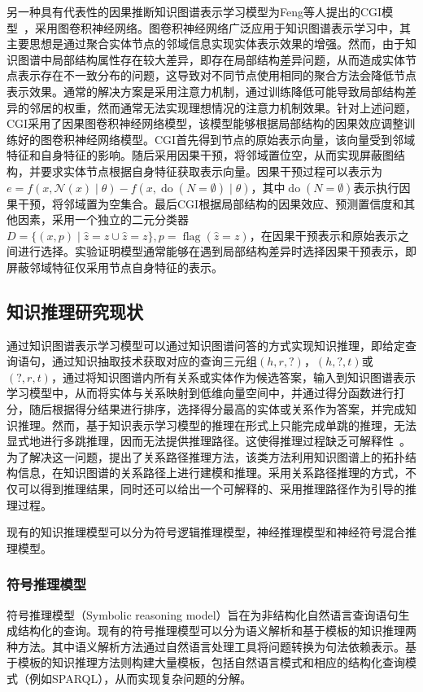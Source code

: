 \documentclass[algorithmlist, AutoFakeBold, AutoFakeSlant, figurelist, tablelist, nomlist, engineering]{seuthesix}
\begin{document}
另一种具有代表性的因果推断知识图谱表示学习模型为Feng等人提出的CGI模型~\cite{feng2021should}，采用图卷积神经网络。图卷积神经网络广泛应用于知识图谱表示学习中，其主要思想是通过聚合实体节点的邻域信息实现实体表示效果的增强。然而，由于知识图谱中局部结构属性存在较大差异，即存在局部结构差异问题，从而造成实体节点表示存在不一致分布的问题，这导致对不同节点使用相同的聚合方法会降低节点表示效果。通常的解决方案是采用注意力机制，通过训练降低可能导致局部结构差异的邻居的权重，然而通常无法实现理想情况的注意力机制效果。针对上述问题，CGI采用了因果图卷积神经网络模型，该模型能够根据局部结构的因果效应调整训练好的图卷积神经网络模型。CGI首先得到节点的原始表示向量，该向量受到邻域特征和自身特征的影响。随后采用因果干预，将邻域置位空，从而实现屏蔽图结构，并要求实体节点根据自身特征获取表示向量。因果干预过程可以表示为$e=f(x, \mathcal{N}(x) \mid \theta)-f(x, \operatorname{do}(N=\emptyset) \mid \theta)$，其中$\operatorname{do}(N=\emptyset)$表示执行因果干预，将邻域置为空集合。最后CGI根据局部结构的因果效应、预测置信度和其他因素，采用一个独立的二元分类器$D=\{(x, p) \mid \hat{z}=z \cup \hat{z}=z\}, p=\operatorname{flag}(\hat{z}=z)$，在因果干预表示和原始表示之间进行选择。实验证明模型通常能够在遇到局部结构差异时选择因果干预表示，即屏蔽邻域特征仅采用节点自身特征的表示。

\subsection{知识推理研究现状}
通过知识图谱表示学习模型可以通过知识图谱问答的方式实现知识推理，即给定查询语句，通过知识抽取技术获取对应的查询三元组$\left(h, r, ?\right)$，$\left(h, ?, t\right)$或$\left(?, r, t\right)$，通过将知识图谱内所有关系或实体作为候选答案，输入到知识图谱表示学习模型中，从而将实体与关系映射到低维向量空间中，并通过得分函数进行打分，随后根据得分结果进行排序，选择得分最高的实体或关系作为答案，并完成知识推理。然而，基于知识表示学习模型的推理在形式上只能完成单跳的推理，无法显式地进行多跳推理，因而无法提供推理路径。这使得推理过程缺乏可解释性~\cite{wang2019deeppath}。为了解决这一问题，提出了关系路径推理方法，该类方法利用知识图谱上的拓扑结构信息，在知识图谱的关系路径上进行建模和推理。采用关系路径推理的方式，不仅可以得到推理结果，同时还可以给出一个可解释的、采用推理路径作为引导的推理过程。

现有的知识推理模型可以分为符号逻辑推理模型，神经推理模型和神经符号混合推理模型。

\subsubsection{符号推理模型}
符号推理模型（Symbolic reasoning model）旨在为非结构化自然语言查询语句生成结构化的查询。现有的符号推理模型可以分为语义解析和基于模板的知识推理两种方法。其中语义解析方法通过自然语言处理工具将问题转换为句法依赖表示。基于模板的知识推理方法则构建大量模板，包括自然语言模式和相应的结构化查询模式（例如SPARQL），从而实现复杂问题的分解。
\end{document}
